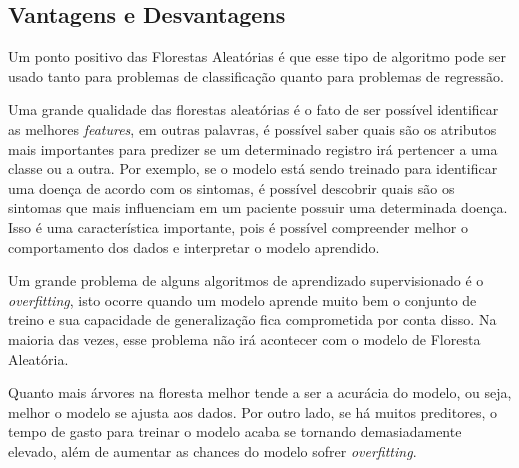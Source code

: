 \subsection{Vantagens e Desvantagens}
Um ponto positivo das Florestas Aleatórias é que esse tipo de algoritmo pode ser usado tanto para problemas de classificação quanto para problemas de regressão. 

Uma grande qualidade das florestas aleatórias é o fato de ser possível identificar as melhores \textit{features}, em outras palavras, é possível saber quais são os atributos mais importantes para predizer se um determinado registro irá pertencer a uma classe ou a outra. Por exemplo, se o modelo está sendo treinado para identificar uma doença de acordo com os sintomas, é possível descobrir quais são os sintomas que mais influenciam em um paciente possuir uma determinada doença. Isso é uma característica importante, pois é possível compreender melhor o comportamento dos dados e interpretar o modelo aprendido.

Um grande problema de alguns algoritmos de aprendizado supervisionado é o \textit{overfitting}, isto ocorre quando um modelo aprende muito bem o conjunto de treino e sua capacidade de generalização fica comprometida por conta disso. Na maioria das vezes, esse problema não irá acontecer com o modelo de Floresta Aleatória.

Quanto mais árvores na floresta melhor tende a ser a acurácia do modelo, ou seja, melhor o modelo se ajusta aos dados. Por outro lado, se há muitos preditores, o tempo de gasto para treinar o modelo acaba se tornando demasiadamente elevado, além de aumentar as chances do modelo sofrer \textit{overfitting}.